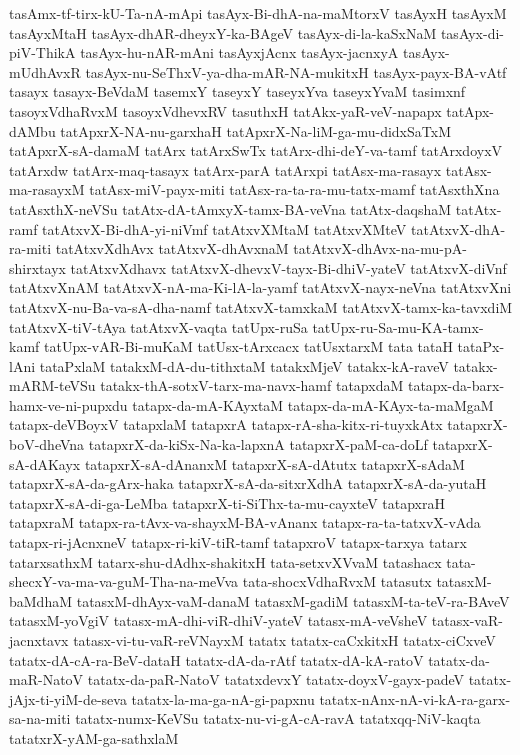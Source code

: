 {tasAmx-tf-tirx-kU-Ta-nA-mApi
tasAyx-Bi-dhA-na-maMtorxV
tasAyxH
tasAyxM
tasAyxMtaH
tasAyx-dhAR-dheyxY-ka-BAgeV
tasAyx-di-la-kaSxNaM
tasAyx-di-piV-ThikA
tasAyx-hu-nAR-mAni
tasAyxjAcnx
tasAyx-jacnxyA
tasAyx-mUdhAvxR
tasAyx-nu-SeThxV-ya-dha-mAR-NA-mukitxH
tasAyx-payx-BA-vAtf
tasayx
tasayx-BeVdaM
tasemxY
taseyxY
taseyxYva
taseyxYvaM
tasimxnf
tasoyxVdhaRvxM
tasoyxVdhevxRV
tasuthxH
tatAkx-yaR-veV-napapx
tatApx-dAMbu
tatApxrX-NA-nu-garxhaH
tatApxrX-Na-liM-ga-mu-didxSaTxM
tatApxrX-sA-damaM
tatArx
tatArxSwTx
tatArx-dhi-deY-va-tamf
tatArxdoyxV
tatArxdw
tatArx-maq-tasayx
tatArx-parA
tatArxpi
tatAsx-ma-rasayx
tatAsx-ma-rasayxM
tatAsx-miV-payx-miti
tatAsx-ra-ta-ra-mu-tatx-mamf
tatAsxthXna
tatAsxthX-neVSu
tatAtx-dA-tAmxyX-tamx-BA-veVna
tatAtx-daqshaM
tatAtx-ramf
tatAtxvX-Bi-dhA-yi-niVmf
tatAtxvXMtaM
tatAtxvXMteV
tatAtxvX-dhA-ra-miti
tatAtxvXdhAvx
tatAtxvX-dhAvxnaM
tatAtxvX-dhAvx-na-mu-pA-shirxtayx
tatAtxvXdhavx
tatAtxvX-dhevxV-tayx-Bi-dhiV-yateV
tatAtxvX-diVnf
tatAtxvXnAM
tatAtxvX-nA-ma-Ki-lA-la-yamf
tatAtxvX-nayx-neVna
tatAtxvXni
tatAtxvX-nu-Ba-va-sA-dha-namf
tatAtxvX-tamxkaM
tatAtxvX-tamx-ka-tavxdiM
tatAtxvX-tiV-tAya
tatAtxvX-vaqta
tatUpx-ruSa
tatUpx-ru-Sa-mu-KA-tamx-kamf
tatUpx-vAR-Bi-muKaM
tatUsx-tArxcacx
tatUsxtarxM
tata
tataH
tataPx-lAni
tataPxlaM
tatakxM-dA-du-tithxtaM
tatakxMjeV
tatakx-kA-raveV
tatakx-mARM-teVSu
tatakx-thA-sotxV-tarx-ma-navx-hamf
tatapxdaM
tatapx-da-barx-hamx-ve-ni-pupxdu
tatapx-da-mA-KAyxtaM
tatapx-da-mA-KAyx-ta-maMgaM
tatapx-deVBoyxV
tatapxlaM
tatapxrA
tatapx-rA-sha-kitx-ri-tuyxkAtx
tatapxrX-boV-dheVna
tatapxrX-da-kiSx-Na-ka-lapxnA
tatapxrX-paM-ca-doLf
tatapxrX-sA-dAKayx
tatapxrX-sA-dAnanxM
tatapxrX-sA-dAtutx
tatapxrX-sAdaM
tatapxrX-sA-da-gArx-haka
tatapxrX-sA-da-sitxrXdhA
tatapxrX-sA-da-yutaH
tatapxrX-sA-di-ga-LeMba
tatapxrX-ti-SiThx-ta-mu-cayxteV
tatapxraH
tatapxraM
tatapx-ra-tAvx-va-shayxM-BA-vAnanx
tatapx-ra-ta-tatxvX-vAda
tatapx-ri-jAcnxneV
tatapx-ri-kiV-tiR-tamf
tatapxroV
tatapx-tarxya
tatarx
tatarxsathxM
tatarx-shu-dAdhx-shakitxH
tata-setxvXVvaM
tatashacx
tata-shecxY-va-ma-va-guM-Tha-na-meVva
tata-shocxVdhaRvxM
tatasutx
tatasxM-baMdhaM
tatasxM-dhAyx-vaM-danaM
tatasxM-gadiM
tatasxM-ta-teV-ra-BAveV
tatasxM-yoVgiV
tatasx-mA-dhi-viR-dhiV-yateV
tatasx-mA-veVsheV
tatasx-vaR-jacnxtavx
tatasx-vi-tu-vaR-reVNayxM
tatatx
tatatx-caCxkitxH
tatatx-ciCxveV
tatatx-dA-cA-ra-BeV-dataH
tatatx-dA-da-rAtf
tatatx-dA-kA-ratoV
tatatx-da-maR-NatoV
tatatx-da-paR-NatoV
tatatxdevxY
tatatx-doyxV-gayx-padeV
tatatx-jAjx-ti-yiM-de-seva
tatatx-la-ma-ga-nA-gi-papxnu
tatatx-nAnx-nA-vi-kA-ra-garx-sa-na-miti
tatatx-numx-KeVSu
tatatx-nu-vi-gA-cA-ravA
tatatxqq-NiV-kaqta
tatatxrX-yAM-ga-sathxlaM
}
